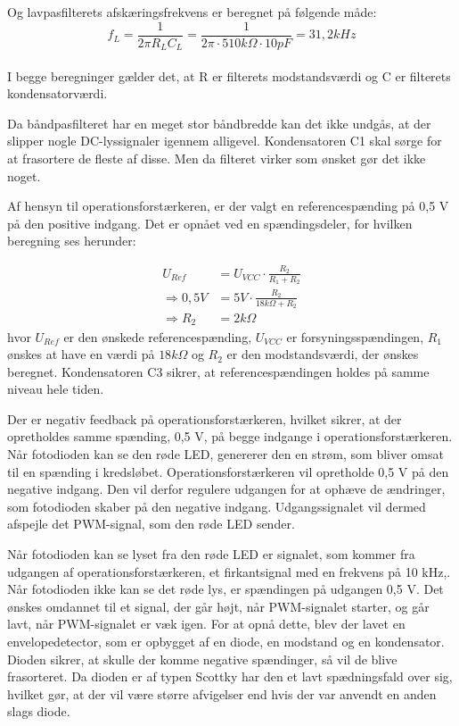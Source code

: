 Og lavpasfilterets afskæringsfrekvens er beregnet på følgende måde: \\

\begin{equation}
	f_{L} = \frac{1}{2\pi R_{L} C_{L}}=\frac{1}{2\pi \cdot 510k\Omega \cdot 10pF}=31,2kHz
	\label{cutofflavpas}
\end{equation} \\

I begge beregninger gælder det, at R er filterets modstandsværdi og C er filterets kondensatorværdi. 

Da båndpasfilteret har en meget stor båndbredde kan det ikke undgås, at der slipper nogle DC-lyssignaler igennem alligevel. Kondensatoren C1 skal sørge for at frasortere de fleste af disse. Men da filteret virker som ønsket gør det ikke noget. 

Af hensyn til operationsforstærkeren, er der valgt en referencespænding på 0,5 V på den positive indgang. Det er opnået ved en spændingsdeler, for hvilken beregning ses herunder: 

\begin{align}
	U_{Ref}&=U_{VCC} \cdot \frac{R_{2}}{R_{1}+R_{2}} \\ 	\nonumber
	\Rightarrow 0,5V &= 5V \cdot \frac{R_{2}}{18k\Omega + R_{2}} \\	
	\Rightarrow R_{2}&=2k\Omega		\nonumber
\end{align}
\noindent hvor $U_{Ref}$ er den ønskede referencespænding, $U_{VCC}$ er forsyningsspændingen, $R_{1}$ ønskes at have en værdi på $18k\Omega$ og $R_{2}$ er den modstandsværdi, der ønskes beregnet. Kondensatoren C3 sikrer, at referencespændingen holdes på samme niveau hele tiden. 

Der er negativ feedback på operationsforstærkeren, hvilket sikrer, at der opretholdes samme spænding, 0,5 V, på begge indgange i operationsforstærkeren. Når fotodioden kan se den røde LED, genererer den en strøm, som bliver omsat til en spænding i kredsløbet. Operationsforstærkeren vil opretholde 0,5 V på den negative indgang. Den vil derfor regulere udgangen for at ophæve de ændringer, som fotodioden skaber på den negative indgang. Udgangssignalet vil dermed afspejle det PWM-signal, som den røde LED sender. 

Når fotodioden kan se lyset fra den røde LED er signalet, som kommer fra udgangen af operationsforstærkeren, et firkantsignal med en frekvens på 10 kHz,. Når fotodioden ikke kan se det røde lys, er spændingen på udgangen 0,5 V. Det ønskes omdannet til et signal, der går højt, når PWM-signalet starter, og går lavt, når PWM-signalet er væk igen. For at opnå dette, blev der lavet en envelopedetector, som er opbygget af en diode, en modstand og en kondensator. Dioden sikrer, at skulle der komme negative spændinger, så vil de blive frasorteret. Da dioden er af typen Scottky har den et lavt spædningsfald over sig, hvilket gør, at der vil være større afvigelser end hvis der var anvendt en anden slags diode. 

